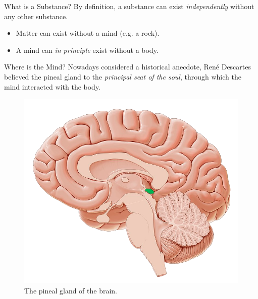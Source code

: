 \documentclass[aspectratio=1610]{beamer}
\begin{document}

\begin{frame}{What is a Substance?}
	By definition, a \alert{substance} can exist \emph{independently} without any other substance.

	\begin{itemize}
		\pause
		\item Matter can exist without a mind (e.g. a rock).
		\pause
		\item A mind can \textit{in principle} exist without a body.
	\end{itemize}
\end{frame}


\begin{frame}{Where is the Mind?}
	Nowadays considered a historical anecdote, René Descartes believed the \alert{pineal gland} to the \textit{principal seat of the soul}, through which the mind interacted with the body.

	\begin{figure}
		\centering
		\includegraphics[height=0.55\paperheight]{inc/pineal_gland.png}
		\caption{The pineal gland of the brain.}
	\end{figure}
\end{frame}

\end{document}
